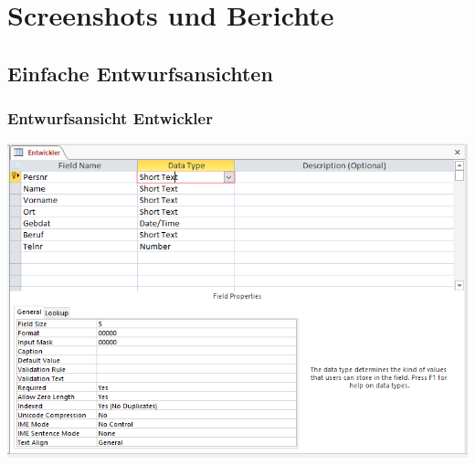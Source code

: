 
\renewcommand{\workingdir}{../../../../}
\renewcommand{\Autorformat}[1]{\textcolor{darkgray}{#1}}
%


\newcommand{\folie}[2]{\begin{center}
\texttt{[image: Vorlesung/oneperpage/Kap\#1.pdf]}
\end{center}}
\newcommand{\Folie}[2]{\begin{center}
\texttt{[image: Vorlesung/oneperpage/Kap\#1.pdf]}
\end{center}}


\maketitle
\newpage
\tableofcontents
\newpage

\chapter{Screenshots und Berichte}
\section{Einfache Entwurfsansichten}
\subsection{Entwurfsansicht Entwickler}
\includegraphics[width=.98\columnwidth]{1Entwickler.PNG}
